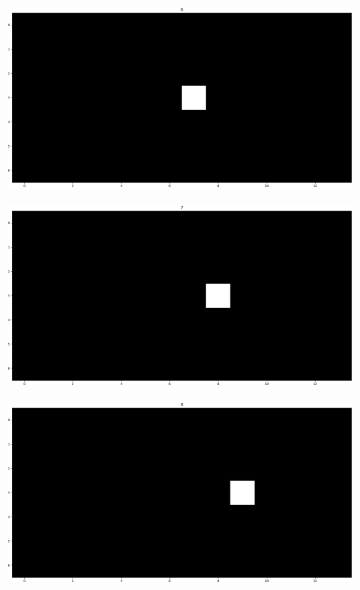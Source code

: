 \documentclass[runningheads]{llncs}
\begin{document}
\begin{figure}
	\begin{subfigure}[b]{0.32\textwidth}
		\centering
		\includegraphics[width=\textwidth]{imgs/prediction_default_lab/it_06.png}
		\caption{}
		\label{fig:localization_step6}
	\end{subfigure}
	\begin{subfigure}[b]{0.32\textwidth}
		\centering
		\includegraphics[width=\textwidth]{imgs/prediction_default_lab/it_07.png}
		\caption{}
		\label{fig:localization_step7}
	\end{subfigure}
	\begin{subfigure}[b]{0.32\textwidth}
		\centering
		\includegraphics[width=\textwidth]{imgs/prediction_default_lab/it_08.png}
		\caption{}
		\label{fig:localization_step8}
	\end{subfigure}
	

\end{figure}
\end{document}

